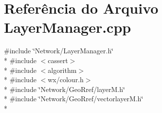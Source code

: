 \section{Referência do Arquivo Layer\+Manager.\+cpp}
\label{_layer_manager_8cpp}
{\ttfamily \#include \char`\"{}Network/\+Layer\+Manager.\+h\char`\"{}}\\*
{\ttfamily \#include $<$cassert$>$}\\*
{\ttfamily \#include $<$algorithm$>$}\\*
{\ttfamily \#include $<$wx/colour.\+h$>$}\\*
{\ttfamily \#include \char`\"{}Network/\+Geo\+Rref/layer\+M.\+h\char`\"{}}\\*
{\ttfamily \#include \char`\"{}Network/\+Geo\+Rref/vectorlayer\+M.\+h\char`\"{}}\\*
